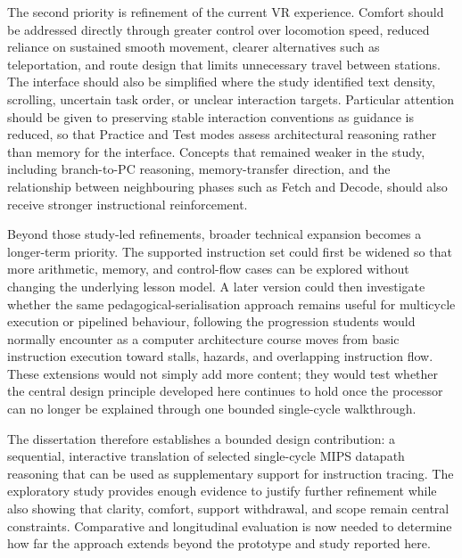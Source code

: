 The second priority is refinement of the current VR experience. Comfort should be addressed directly through greater control over locomotion speed, reduced reliance on sustained smooth movement, clearer alternatives such as teleportation, and route design that limits unnecessary travel between stations. The interface should also be simplified where the study identified text density, scrolling, uncertain task order, or unclear interaction targets. Particular attention should be given to preserving stable interaction conventions as guidance is reduced, so that Practice and Test modes assess architectural reasoning rather than memory for the interface. Concepts that remained weaker in the study, including branch-to-PC reasoning, memory-transfer direction, and the relationship between neighbouring phases such as Fetch and Decode, should also receive stronger instructional reinforcement.

Beyond those study-led refinements, broader technical expansion becomes a longer-term priority. The supported instruction set could first be widened so that more arithmetic, memory, and control-flow cases can be explored without changing the underlying lesson model. A later version could then investigate whether the same pedagogical-serialisation approach remains useful for multicycle execution or pipelined behaviour, following the progression students would normally encounter as a computer architecture course moves from basic instruction execution toward stalls, hazards, and overlapping instruction flow. These extensions would not simply add more content; they would test whether the central design principle developed here continues to hold once the processor can no longer be explained through one bounded single-cycle walkthrough.

The dissertation therefore establishes a bounded design contribution: a sequential, interactive translation of selected single-cycle MIPS datapath reasoning that can be used as supplementary support for instruction tracing. The exploratory study provides enough evidence to justify further refinement while also showing that clarity, comfort, support withdrawal, and scope remain central constraints. Comparative and longitudinal evaluation is now needed to determine how far the approach extends beyond the prototype and study reported here.
